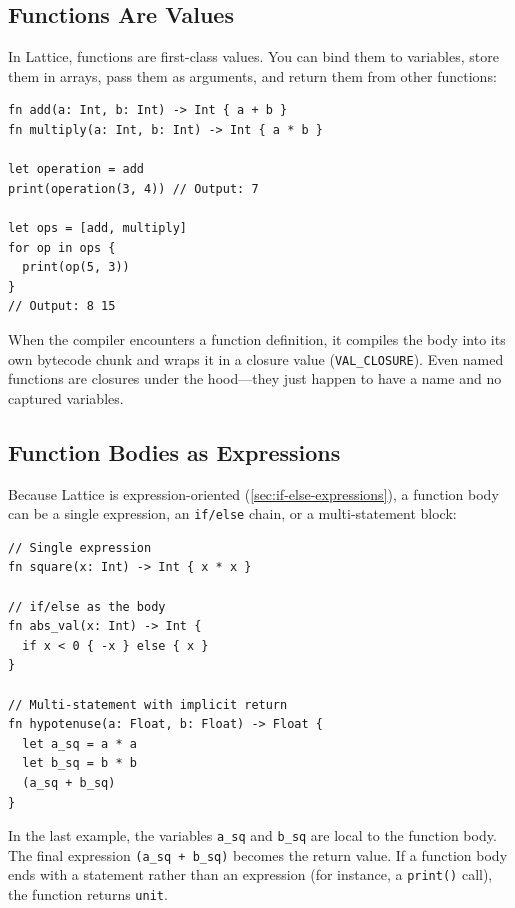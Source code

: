\subsection{Functions Are Values}\label{sec:functions-are-values}

In Lattice, functions are first-class values. You can bind them to variables, store them in arrays, pass them as arguments, and return them from other functions:

\begin{lstlisting}[language=Lattice, caption={Functions as values}]
fn add(a: Int, b: Int) -> Int { a + b }
fn multiply(a: Int, b: Int) -> Int { a * b }

let operation = add
print(operation(3, 4)) // Output: 7

let ops = [add, multiply]
for op in ops {
  print(op(5, 3))
}
// Output: 8 15
\end{lstlisting}

When the compiler encounters a function definition, it compiles the body into its own bytecode chunk and wraps it in a closure value (\lstinline|VAL_CLOSURE|). Even named functions are closures under the hood---they just happen to have a name and no captured variables.

\subsection{Function Bodies as Expressions}\label{sec:fn-bodies-expressions}

Because Lattice is expression-oriented (\cref{sec:if-else-expressions}), a function body can be a single expression, an \lstinline|if/else| chain, or a multi-statement block:

\begin{lstlisting}[language=Lattice, caption={Various function body styles}]
// Single expression
fn square(x: Int) -> Int { x * x }

// if/else as the body
fn abs_val(x: Int) -> Int {
  if x < 0 { -x } else { x }
}

// Multi-statement with implicit return
fn hypotenuse(a: Float, b: Float) -> Float {
  let a_sq = a * a
  let b_sq = b * b
  (a_sq + b_sq)
}
\end{lstlisting}

In the last example, the variables \lstinline|a_sq| and \lstinline|b_sq| are local to the function body. The final expression \lstinline|(a_sq + b_sq)| becomes the return value. If a function body ends with a statement rather than an expression (for instance, a \lstinline|print()| call), the function returns \lstinline|unit|.

